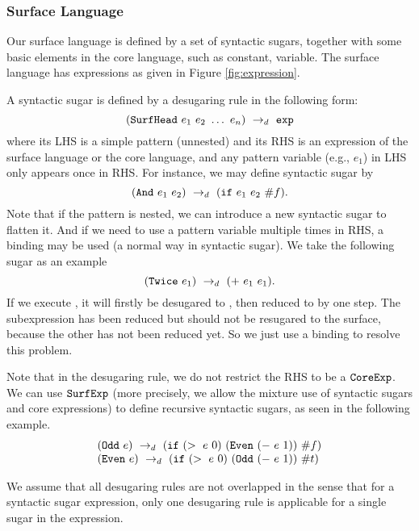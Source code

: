 \subsubsection{Surface Language}

Our surface language is defined by a set of syntactic sugars, together with some basic elements in the core language, such as constant, variable. The surface language has expressions as given in Figure \ref{fig:expression}.

A syntactic sugar is defined by a desugaring rule in the following form:
\[
(\mbox{\tt SurfHead}~e_1~e_2~\ldots~e_n) ~\rightarrow_d~ \mbox{\tt exp}
\]
where its LHS is a simple pattern (unnested) and its RHS is an expression of the surface language or the core language, and any pattern variable (e.g., $e_1$) in LHS only appears once in RHS. For instance, we may define syntactic sugar  by
\[
(\mbox{\tt And}~e_1~e_2) ~\rightarrow_d~ (\mbox{\tt if}~e_1~e_2~\#f).
\]
Note that if the pattern is nested, we can introduce a new syntactic sugar to flatten it. And if we need to use a pattern variable multiple times in RHS, a  binding may be used (a normal way in syntactic sugar). We take the following sugar as an example
\[
(\mbox{\tt Twice}~e_1) ~\rightarrow_d~ (+~e_1~e_1).
\]
If we execute , it will firstly be desugared to , then reduced to  by one step. The subexpression  has been reduced but should not be resugared to the surface, because the other  has not been reduced yet.
So we just use a  binding to resolve this problem.

Note that in the desugaring rule, we do not restrict the RHS to be a $\mbox{\tt CoreExp}$. We can use $\mbox{\tt SurfExp}$ (more precisely, we allow the mixture use of syntactic sugars and core expressions) to define recursive syntactic sugars, as seen in the following example.
\[
\begin{array}{l}
(\mbox{\tt Odd}~e) ~\rightarrow_d~ (\mbox{\tt if}~(>~e~0)~(\mbox{\tt Even}~(-~e~1))~\#f)\\
(\mbox{\tt Even}~e) ~\rightarrow_d~ (\mbox{\tt if}~(>~e~0)~(\mbox{\tt Odd}~(-~e~1))~\#t)
\end{array}
\]

We assume that all desugaring rules are not overlapped in the sense that for a syntactic sugar expression, only one desugaring rule is applicable for a single sugar in the expression.


